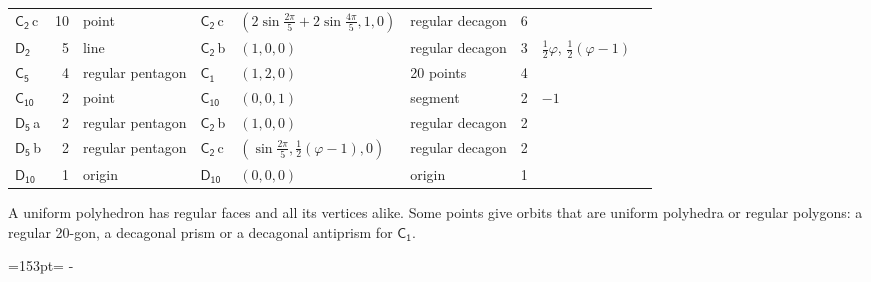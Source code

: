 \documentclass[10pt,a4paper]{article}
\newcommand{\needspace}[1]{\par\penalty-100\begingroup\dimen0=#1\relax\dimen2=\pagegoal
  \advance\dimen2-\pagetotal\ifdim\dimen0>\dimen2\relax\ifdim\dimen2>0pt\vfil\break\fi\fi
  \endgroup}
\numberwithin{equation}{section}
\newcommand{\grp}[1]{\mathsf{#1}}
\newcommand{\clsletter}[1]{\,{\scriptsize\color{black!55}#1}}
\newcommand{\goldenratio}{\varphi}
\newlength{\fillwidth}\newlength{\cellwidth}\newlength{\colwidth}
\begin{document}
{{\begin{longtable}{@{}lrllllr>{\RaggedRight\arraybackslash}p{\fillwidth}r@{}}
\href{C2.pdf}{$\grp{C_{2}}$}\clsletter{c} & 10 & point & \href{C2.pdf}{$\grp{C_{2}}$}\clsletter{c} & $(2\sin\tfrac{2\pi}{5} + 2\sin\tfrac{4\pi}{5}, 1, 0)$ & regular decagon & 6 &  & \\
\href{D2.pdf}{$\grp{D_{2}}$} & 5 & line & \href{C2.pdf}{$\grp{C_{2}}$}\clsletter{b} & $(1, 0, 0)$ & regular decagon & 3 & ${\tfrac{1}{2}\goldenratio{}}$, ${\tfrac{1}{2}(\goldenratio - 1)}$ & \\
\href{C5.pdf}{$\grp{C_{5}}$} & 4 & regular pentagon & \href{C1.pdf}{$\grp{C_{1}}$} & $(1, 2, 0)$ & 20 points & 4 &  & \\
\href{C10.pdf}{$\grp{C_{10}}$} & 2 & point & \href{C10.pdf}{$\grp{C_{10}}$} & $(0, 0, 1)$ & segment & 2 & ${-1}$ & \\
\href{D5.pdf}{$\grp{D_{5}}$}\clsletter{a} & 2 & regular pentagon & \href{C2.pdf}{$\grp{C_{2}}$}\clsletter{b} & $(1, 0, 0)$ & regular decagon & 2 &  & \\
\href{D5.pdf}{$\grp{D_{5}}$}\clsletter{b} & 2 & regular pentagon & \href{C2.pdf}{$\grp{C_{2}}$}\clsletter{c} & $(\sin\tfrac{2\pi}{5}, \tfrac{1}{2}(\goldenratio - 1), 0)$ & regular decagon & 2 &  & \\*
\href{D10.pdf}{$\grp{D_{10}}$} & 1 & origin & \href{D10.pdf}{$\grp{D_{10}}$} & $(0, 0, 0)$ & origin & 1 &  & \\
\bottomrule\end{longtable}}}
A uniform polyhedron has regular faces and all its vertices alike. Some points give orbits that are uniform polyhedra or regular polygons: a regular 20-gon, a decagonal prism or a decagonal antiprism for \href{C1.pdf}{$\grp{C_{1}}$}.
\needspace{153pt}
\end{document}
